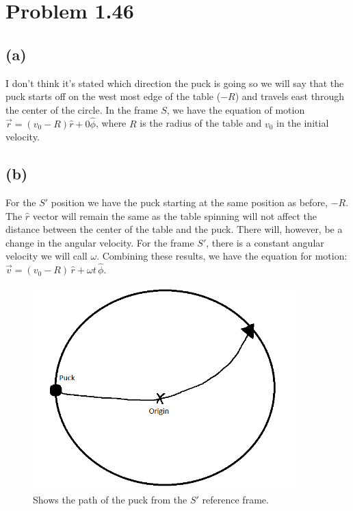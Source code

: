 \documentclass[12pt, a4paper]{article}
\begin{document}
\pagebreak
\section*{Problem 1.46}
\subsection*{(a)}
I don't think it's stated which direction the puck is going so we will say that the puck starts off on the west most edge of the table ($-R$) and travels east through the center of the circle. In the frame $S$, we have the equation of motion $\boxed{\vec{r} =  (v_0 - R)\hat{r} + 0\hat{\phi}}$, where $R$ is the radius of the table and $v_0$ in the initial velocity.  

\subsection*{(b)}
For the $S'$ position we have the puck starting at the same position as before, $-R$. The $\hat{r}$ vector will remain the same as the table spinning will not affect the distance between the center of the table and the puck. There will, however, be a change in the angular velocity. For the frame $S'$, there is a constant angular velocity we will call $\omega$. Combining these results, we have the equation for motion: $\boxed{\vec{v} = (v_0 - R)\,\hat{r} + \omega t \,\hat{\phi}}$.
\begin{figure}[h]
  \centering
  \includegraphics[width=4in]{fig_3.png}
  \caption{Shows the path of the puck from the $S'$ reference frame.}
  \label{fig_1}
\end{figure}
\end{document}
